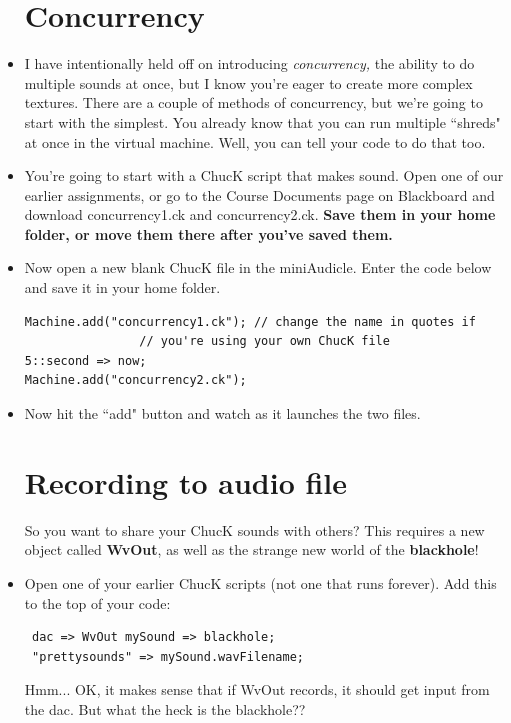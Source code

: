 \documentclass{article}
\begin{document}
\begin{itemize}
\section {Concurrency}

\item I have intentionally held off on introducing \textsl{concurrency,} the ability to
do multiple sounds at once, but I know you're eager to create more complex textures. There are a couple of methods of concurrency, but we're going to start with the simplest. You already know that you can run multiple ``shreds" at once in the virtual machine. Well, you can tell your code to do that too.

\item You're going to start with a ChucK script that makes sound. Open one of our earlier assignments, or go to the Course Documents page on Blackboard and download concurrency1.ck and concurrency2.ck. \textbf{Save them in your home folder, or move them there after you've saved them.}

\item Now open a new blank ChucK file in the miniAudicle. Enter the code below and save it in your home folder.

\begin{lstlisting}
Machine.add("concurrency1.ck"); // change the name in quotes if
				// you're using your own ChucK file
5::second => now;
Machine.add("concurrency2.ck");
\end{lstlisting}

\item Now hit the ``add" button and watch as it launches the two files.

\section {Recording to audio file}

So you want to share your ChucK sounds with others? This requires a new object called \textbf{WvOut}, as well as the strange new world of the \textbf{blackhole}!

\item Open one of your earlier ChucK scripts (not one that runs forever). Add this to the top of your code:

\begin{lstlisting}
 dac => WvOut mySound => blackhole;
 "prettysounds" => mySound.wavFilename;
\end{lstlisting}

Hmm... OK, it makes sense that if WvOut records, it should get input from the dac. But what the heck is the blackhole??


\end{itemize}
\end{document}
